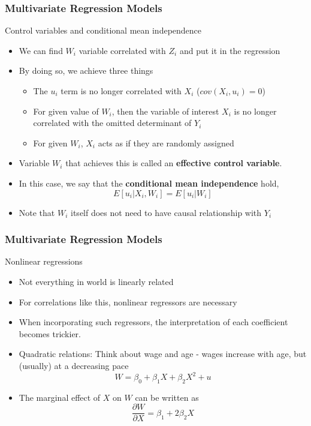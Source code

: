 \documentclass[compress]{beamer}
\begin{document}
\begin{frame}
\frametitle{Multivariate Regression Models}
Control variables and conditional mean independence
\begin{itemize}
 \item We can find $W_i$ variable correlated with $Z_i$ and put it in the regression
 \item By doing so, we achieve three things
\begin{itemize}
\item The $u_i$ term is no longer correlated with $X_i$ ($cov(X_i, u_i)=0$)
\item For given value of $W_i$, then the variable of interest $X_i$ is no longer correlated with the omitted determinant of $Y_i$
\item For given $W_i$, $X_i$ acts as if they are randomly assigned
\end{itemize}
\item Variable $W_i$ that achieves this is called an \textbf{effective control variable}. 
\item In this case, we say that the \textbf{conditional mean independence} hold, 
\[
E[u_i|X_i,W_i]= E[u_i|W_i]
\]
\item Note that $W_i$ itself does not need to have causal relationship with $Y_i$

\end{itemize}
\end{frame}

\begin{frame}
\frametitle{Multivariate Regression Models}
Nonlinear regressions
\begin{itemize}
 \item Not everything in world is linearly related
 \item For correlations like this, nonlinear regressors are necessary
 \item When incorporating such regressors, the interpretation of each coefficient becomes trickier.
 \item Quadratic relations: Think about wage and age - wages increase with age, but (usually) at a decreasing pace
 \[
W = \beta_0 + \beta_1 X+ \beta_2 X^2+u
\]
\item The marginal effect of $X$ on $W$ can be written as
\[
\frac{\partial W}{\partial X}=\beta_1+2\beta_2 X
\]
\end{itemize}
\end{frame}
\end{document}
